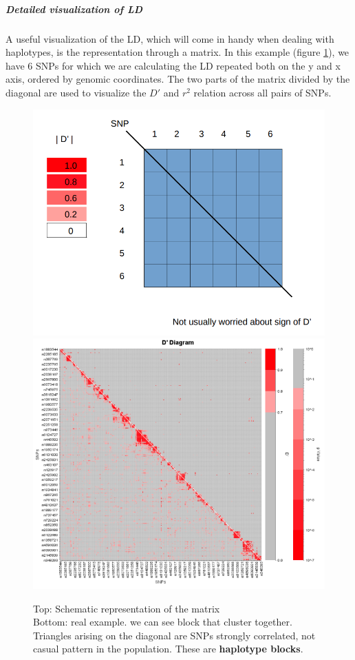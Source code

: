 			\subparagraph{Detailed visualization of LD}
			A useful visualization of the LD, which will come in handy when dealing with haplotypes, is the representation through a matrix. 
			In this example (figure \ref{fig:visual}), we have 6 SNPs for which we are calculating the LD repeated both on the y and x axis, ordered by genomic coordinates. 
			The two parts of the matrix divided by the diagonal are used to visualize the $D'$ and $r^2$ relation across all pairs of SNPs.
			
			\begin{figure}[H]
				\centering
				\includegraphics[scale=0.2]{vis1}
				\includegraphics[scale=0.3]{vis2}
				\caption{Top: Schematic representation of the matrix\\
				Bottom: real example. we can see block that cluster together. Triangles arising on the diagonal are SNPs strongly correlated, not casual pattern in the population. These are \textbf{haplotype blocks}. }
				\label{fig:visual}
				\end{figure}
			

